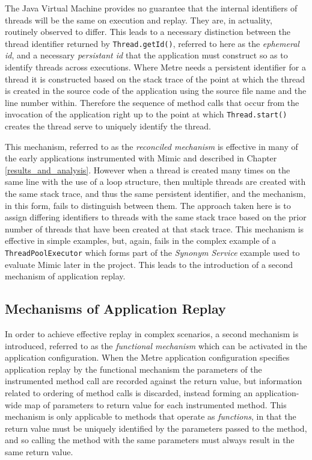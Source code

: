 \documentclass[]{final_report}
\begin{document}
The Java Virtual Machine provides no guarantee that the internal identifiers of threads will be the same on execution and replay. They are, in actuality, routinely observed to differ. This leads to a necessary distinction between the thread identifier returned by \linebreak[4] \lstinline{Thread.getId()}, referred to here as the \textit{ephemeral id}, and a necessary \textit{persistant id} that the application must construct so as to identify threads across executions. Where Metre needs a persistent identifier for a thread it is constructed based on the stack trace of the point at which the thread is created in the source code of the application using the source file name and the line number within. Therefore the sequence of method calls that occur from the invocation of the application right up to the point at which \lstinline{Thread.start()}\noop{} creates the thread serve to uniquely identify the thread.

This mechanism, referred to as the \textit{reconciled mechanism} is effective in many of the early applications instrumented with Mimic and described in Chapter \ref{results_and_analysis}. However when a thread is created many times on the same line with the use of a loop structure, then multiple threads are created with the same stack trace, and thus the same persistent identifier, and the mechanism, in this form, fails to distinguish between them. The approach taken here is to assign differing identifiers to threads with the same stack trace based on the prior number of threads that have been created at that stack trace. This mechanism is effective in simple examples, but, again, fails in the complex example of a \lstinline{ThreadPoolExecutor}\noop{} which forms part of the \textit{Synonym Service} example used to evaluate Mimic later in the project. This leads to the introduction of a second mechanism of application replay.

\subsection{Mechanisms of Application Replay \label{mechanism}}

In order to achieve effective replay in complex scenarios, a second mechanism is introduced, referred to as the \textit{functional mechanism} which can be activated in the application configuration. When the Metre application configuration specifies application replay by the functional mechanism the parameters of the instrumented method call are recorded against the return value, but information related to ordering of method calls is discarded, instead forming an application-wide map of parameters to return value for each instrumented method. This mechanism is only applicable to methods that operate as \textit{functions}, in that the return value must be uniquely identified by the parameters passed to the method, and so calling the method with the same parameters must always result in the same return value.
\end{document}
